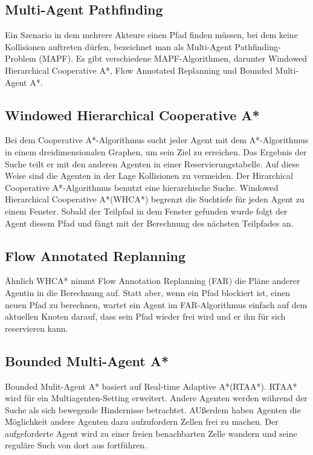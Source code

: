 \subsection{Multi-Agent Pathfinding}

Ein Szenario in dem mehrere Akteure einen Pfad finden müssen, bei dem keine Kollisionen auftreten dürfen, bezeichnet man als Multi-Agent Pathfinding-Problem (MAPF). Es gibt verschiedene MAPF-Algorithmen, darunter Windowed Hierarchical Cooperative A*, Flow Annotated Replanning und Bounded Multi-Agent A*.

\subsection{Windowed Hierarchical Cooperative A*}
Bei dem Cooperative A*-Algorithmus sucht jeder Agent mit dem A*-Algorithmus in einem dreidimensionalen Graphen, um sein Ziel zu erreichen. Das Ergebnis der Suche teilt er mit den anderen Agenten in einer Reservierungstabelle. Auf diese Weise sind die Agenten in der Lage Kollisionen zu vermeiden. Der Hirarchical Cooperative A*-Algorithmus benutzt eine hierarchische Suche. Windowed Hierarchical Cooperative A*(WHCA*) begrenzt die Suchtiefe für jeden Agent zu einem Fenster. Sobald der Teilpfad in dem Fenster gefunden wurde folgt der Agent diesem Pfad und fängt mit der Berechnung des nächsten Teilpfades an. 
\subsection{Flow Annotated Replanning}
Ähnlich WHCA* nimmt Flow Annotation Replanning (FAR) die Pläne anderer Agentin in die Berechnung auf. Statt aber, wenn ein Pfad blockiert ist, einen neuen Pfad zu berechnen, wartet ein Agent im FAR-Algorithmus einfach auf dem aktuellen Knoten darauf, dass sein Pfad wieder frei wird und er ihn für sich reservieren kann. 

\subsection{Bounded Multi-Agent A*}
Bounded Mulit-Agent A* basiert auf Real-time Adaptive A*(RTAA*). RTAA* wird für ein Multiagenten-Setting erweitert. Andere Agenten werden während der Suche als sich bewegende Hindernisse betrachtet. AUßerdem haben Agenten die Möglichkeit andere Agenten dazu aufzufordern Zellen frei zu machen. Der aufgeforderte Agent wird zu einer freien benachbarten Zelle wandern und seine reguläre Such von dort aus fortführen\cite{Sigurdson.2019}.